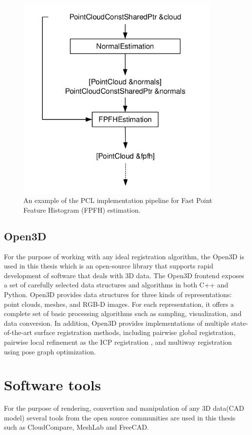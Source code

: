 \begin{figure}[!h]
\begin{center}
\includegraphics[width=4in]{figures02/pcl1.png}
\caption{An  example  of  the  PCL  implementation  pipeline  for  Fast  Point Feature Histogram (FPFH) \cite{fpfh} estimation.}
\end{center}
\end{figure}


\subsection{Open3D}

For the purpose of working with any ideal registration algorithm, the Open3D is used in this thesis which is an open-source library that supports rapid development of software that deals with 3D data. The Open3D frontend exposes a set of carefully selected data structures and algorithms in both C++ and Python. Open3D provides data structures for three kinds of representations: point clouds, meshes, and RGB-D images.  For each representation, it offers a complete set of basic processing algorithms such as sampling, visualization, and data conversion. In addition, Open3D  provides  implementations  of  multiple  state-of-the-art surface registration methods, including pairwise global registration, pairwise local refinement as the ICP registration \cite{icp}, and multiway registration  using  pose  graph  optimization. 

\section{Software tools}
For the purpose of rendering, convertion and manipulation of any 3D data(CAD model) several tools from the open source communities are used in this thesis such as CloudCompare, MeshLab and FreeCAD. 

